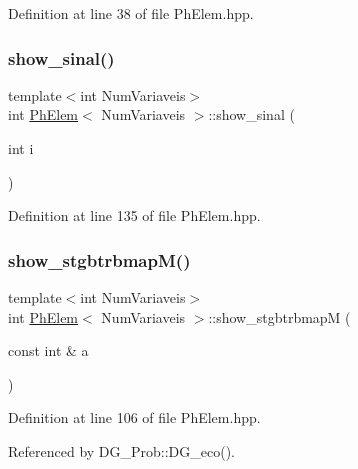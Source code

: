 Definition at line 38 of file Ph\+Elem.\+hpp.

\mbox{\label{classPhElem_a47dc705efd50a4484bf407bce4a5e010}} 
\subsubsection{\texorpdfstring{show\+\_\+sinal()}{show\_sinal()}}
{\footnotesize\ttfamily template$<$int Num\+Variaveis$>$ \\
int \hyperlink{classPhElem}{Ph\+Elem}$<$ Num\+Variaveis $>$\+::show\+\_\+sinal (\begin{DoxyParamCaption}\item[{int}]{i }\end{DoxyParamCaption})\hspace{0.3cm}{\ttfamily [inline]}}



Definition at line 135 of file Ph\+Elem.\+hpp.

\mbox{\label{classPhElem_a5f0e8811ea30343e51e4be9ff40d2b74}} 
\subsubsection{\texorpdfstring{show\+\_\+stgbtrbmap\+M()}{show\_stgbtrbmapM()}}
{\footnotesize\ttfamily template$<$int Num\+Variaveis$>$ \\
int \hyperlink{classPhElem}{Ph\+Elem}$<$ Num\+Variaveis $>$\+::show\+\_\+stgbtrbmapM (\begin{DoxyParamCaption}\item[{const int \&}]{a }\end{DoxyParamCaption})\hspace{0.3cm}{\ttfamily [inline]}}



Definition at line 106 of file Ph\+Elem.\+hpp.



Referenced by D\+G\+\_\+\+Prob\+::\+D\+G\+\_\+eco().

